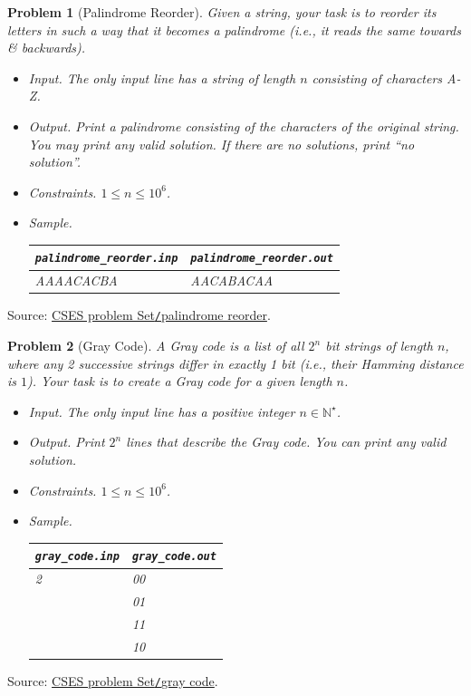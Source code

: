 \documentclass{article}
\newtheorem{problem}{Problem}
\begin{document}
\begin{problem}[Palindrome Reorder]
	Given a string, your task is to reorder its letters in such a way that it becomes a palindrome (i.e., it reads the same towards \& backwards).
	\begin{itemize}
		\item {\sf Input.} The only input line has a string of length $n$ consisting of characters A-Z.
		\item {\sf Output.} Print a palindrome consisting of the characters of the original string. You may print any valid solution. If there are no solutions, print ``no solution''.
		\item {\sf Constraints.} $1\le n\le10^6$.
		\item {\sf Sample.}
		\begin{table}[H]
			\centering
			\begin{tabular}{|l|l|}
				\hline
				\verb|palindrome_reorder.inp| & \verb|palindrome_reorder.out| \\
				\hline
				AAAACACBA & AACABACAA \\
				\hline
			\end{tabular}
		\end{table}
	\end{itemize}
\end{problem}
Source: \href{https://cses.fi/problemset/task/1755}{CSES problem Set{\tt/}palindrome reorder}.

\begin{problem}[Gray Code]
	A Gray code is a list of all $2^n$ bit strings of length $n$, where any 2 successive strings differ in exactly 1 bit (i.e., their Hamming distance is $1$). Your task is to create a Gray code for a given length $n$.
	\begin{itemize}
		\item {\sf Input.} The only input line has a positive integer $n\in\mathbb{N}^\star$.
		\item {\sf Output.} Print $2^n$ lines that describe the Gray code. You can print any valid solution.
		\item {\sf Constraints.} $1\le n\le10^6$.
		\item {\sf Sample.}
		\begin{table}[H]
			\centering
			\begin{tabular}{|l|l|}
				\hline
				\verb|gray_code.inp| & \verb|gray_code.out| \\
				\hline
				2 & 00 \\
				& 01 \\
				& 11 \\
				& 10 \\
				\hline
			\end{tabular}
		\end{table}
	\end{itemize}
\end{problem}
Source: \href{https://cses.fi/problemset/task/2205}{CSES problem Set{\tt/}gray code}.
\end{document}
